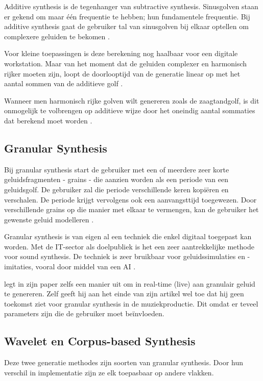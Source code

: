 Additive synthesis is de tegenhanger van subtractive synthesis. Sinusgolven staan er gekend om maar één frequentie te hebben; hun fundamentele frequentie. Bij additive synthesis gaat de gebruiker tal van sinusgolven bij elkaar optellen om complexere geluiden te bekomen \autocite{additive}.

Voor kleine toepassingen is deze berekening nog haalbaar voor een digitale workstation. Maar van het moment dat de geluiden complexer en harmonisch rijker moeten zijn, loopt de doorlooptijd van de generatie linear op met het aantal sommen van de additieve golf \autocite{additive}.

Wanneer men harmonisch rijke golven wilt genereren zoals de zaagtandgolf, is dit onmogelijk te volbrengen op additieve wijze door het oneindig aantal sommaties dat berekend moet worden \autocite{harmonics}.

\subsection{Granular Synthesis}
\label{methode:granular}

Bij granular synthesis start de gebruiker met een of meerdere zeer korte geluidsfragmenten - grains - die aanzien worden als een periode van een geluidsgolf. De gebruiker zal die periode verschillende keren kopiëren en verschalen. De periode krijgt vervolgens ook een aanvangsttijd toegewezen. Door verschillende grains op die manier met elkaar te vermengen, kan de gebruiker het gewenste geluid modelleren \autocite{granular}.

Granular synthesis is van eigen al een techniek die enkel digitaal toegepast kan worden. Met de IT-sector als doelpubliek is het een zeer aantrekkelijke methode voor sound synthesis. De techniek is zeer bruikbaar voor geluidssimulaties en -imitaties, vooral door middel van een AI \autocite{granular}.

\textcite{granular} legt in zijn paper zelfs een manier uit om in real-time (live) aan granulair geluid te genereren. Zelf geeft hij aan het einde van zijn artikel wel toe dat hij geen toekomst ziet voor granular synthesis in de muziekproductie. Dit omdat er teveel parameters zijn die de gebruiker moet beïnvloeden.

\subsection{Wavelet en Corpus-based Synthesis}

Deze twee generatie methodes zijn soorten van granular synthesis. Door hun verschil in implementatie zijn ze elk toepasbaar op andere vlakken.

